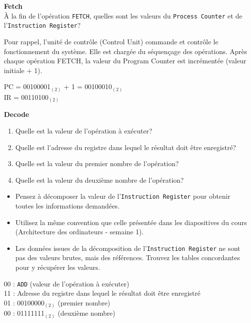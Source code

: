 \begin{Exercice}[5 minutes]\textbf{Fetch}\\
    À la fin de l'opération \lstinline{FETCH}, quelles sont les valeurs du \lstinline{Process Counter} et de l'\lstinline{Instruction Register}?
\end{Exercice}
   \begin{conseil}
    Pour rappel, l’unité de contrôle (Control Unit) commande et contrôle le fonctionnement du système. Elle est chargée du séquençage des opérations. Après chaque opération FETCH, la valeur du Program Counter est incrémentée (valeur initiale + 1).
    \end{conseil}
\begin{solution}
    PC = 00100001$_{(2)}$ + 1 = 00100010$_{(2)}$\\
    IR = 00110100$_{(2)}$
\end{solution}

\begin{Exercice}[5 minutes] \textbf{Decode}
    \begin{enumerate}
        \item Quelle est la valeur de l'opération à exécuter?
        \item Quelle est l'adresse du registre dans lequel le résultat doit être enregistré?
        \item Quelle est la valeur du premier nombre de l'opération?
        \item Quelle est la valeur du deuxième nombre de l'opération?
    \end{enumerate}
\end{Exercice}
   \begin{conseil}
    \begin{itemize}
        \item Pensez à décomposer la valeur de l’\lstinline{Instruction Register} pour obtenir toutes les informations demandées.
        \item  Utilisez la même convention que celle présentée dans les diapositives du cours (Architecture des ordinateurs - semaine 1).
        \item Les données issues de la décomposition de l’\lstinline{Instruction Register} ne sont pas des valeurs brutes, mais des références. Trouvez les tables concordantes pour y récupérer les valeurs.
    \end{itemize}
    
    \end{conseil}
\begin{solution}
    00 : \lstinline{ADD} (valeur de l'opération à exécuter)\\
    11 : Adresse du registre dans lequel le résultat doit être enregistré\\
    01 : 00100000$_{(2)}$ (premier nombre)\\
    00 : 01111111$_{(2)}$ (deuxième nombre)
\end{solution}


